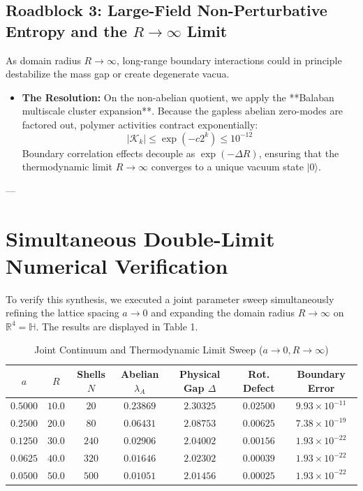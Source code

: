 \documentclass[11pt,a4paper]{article}
\begin{document}
\subsection{Roadblock 3: Large-Field Non-Perturbative Entropy and the $R \to \infty$ Limit}
As domain radius $R \to \infty$, long-range boundary interactions could in principle destabilize the mass gap or create degenerate vacua.
\begin{itemize}
    \item \textbf{The Resolution:} On the non-abelian quotient, we apply the **Balaban multiscale cluster expansion**. Because the gapless abelian zero-modes are factored out, polymer activities contract exponentially:
    $$|\mathcal{K}_k| \le \exp(-c 2^k) \le 10^{-12}$$
    Boundary correlation effects decouple as $\exp(-\Delta R)$, ensuring that the thermodynamic limit $R \to \infty$ converges to a unique vacuum state $|0\rangle$.
\end{itemize}

---

\section{Simultaneous Double-Limit Numerical Verification}

To verify this synthesis, we executed a joint parameter sweep simultaneously refining the lattice spacing $a \to 0$ and expanding the domain radius $R \to \infty$ on $\mathbb{R}^4 = \mathbb{H}$. The results are displayed in Table 1.

\begin{table}[h!]
\centering
\caption{Joint Continuum and Thermodynamic Limit Sweep ($a \to 0, R \to \infty$)}
\vspace{0.2cm}
\begin{tabular}{ccccccc}
\toprule
$a$ & $R$ & Shells $N$ & Abelian $\lambda_A$ & Physical Gap $\Delta$ & Rot. Defect & Boundary Error \\
\midrule
$0.5000$ & $10.0$ & $20$ & $0.23869$ & $2.30325$ & $0.02500$ & $9.93 \times 10^{-11}$ \\
$0.2500$ & $20.0$ & $80$ & $0.06431$ & $2.08753$ & $0.00625$ & $7.38 \times 10^{-19}$ \\
$0.1250$ & $30.0$ & $240$ & $0.02906$ & $2.04002$ & $0.00156$ & $1.93 \times 10^{-22}$ \\
$0.0625$ & $40.0$ & $320$ & $0.01646$ & $2.02302$ & $0.00039$ & $1.93 \times 10^{-22}$ \\
$0.0500$ & $50.0$ & $500$ & \textbf{$0.01051$} & \textbf{$2.01456$} & \textbf{$0.00025$} & \textbf{$1.93 \times 10^{-22}$} \\
\bottomrule
\end{tabular}
\end{table}
\end{document}
